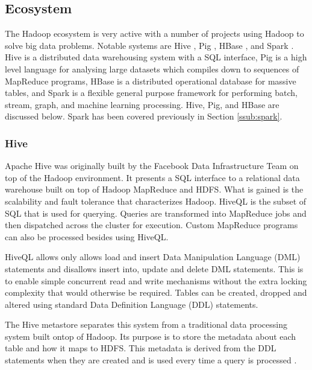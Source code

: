 \documentclass[12pt]{article}
\begin{document}
\subsection{Ecosystem} \label{sub:ecosystem}

The Hadoop ecosystem is very active with a number of projects using Hadoop to solve big data problems. Notable systems are Hive \cite{thusoo2009hive}, Pig \cite{olston2008pig}, HBase \cite{chang2008bigtable}, and Spark \cite{zaharia2010spark}. Hive is a distributed data warehousing system with a SQL interface, Pig is a high level language for analysing large datasets which compiles down to sequences of MapReduce programs, HBase is a distributed operational database for massive tables, and Spark is a flexible general purpose framework for performing batch, stream, graph, and machine learning processing. Hive, Pig, and HBase are discussed below. Spark has been covered previously in Section \ref{ssub:spark}.



\subsubsection{Hive} \label{ssub:hive}

Apache Hive \cite{thusoo2009hive,sakr2013hadoop} was originally built by the Facebook Data Infrastructure Team on top of the Hadoop environment. It presents a SQL interface to a relational data warehouse built on top of Hadoop MapReduce and HDFS. What is gained is the scalability and fault tolerance that characterizes Hadoop. HiveQL is the subset of SQL that is used for querying. Queries are transformed into MapReduce jobs and then dispatched across the cluster for execution. Custom MapReduce programs can also be processed besides using HiveQL.

HiveQL allows only allows load and insert Data Manipulation Language (DML) statements and disallows insert into, update and delete DML statements. This is to enable simple concurrent read and write mechanisms without the extra locking complexity that would otherwise be required. Tables can be created, dropped and altered using standard Data Definition Language (DDL) statements.

The Hive metastore separates this system from a traditional data processing system built ontop of Hadoop. Its purpose is to store the metadata about each table and how it maps to HDFS. This metadata is derived from the DDL statements when they are created and is used every time a query is processed \cite{sakr2013hadoop}.
\end{document}
